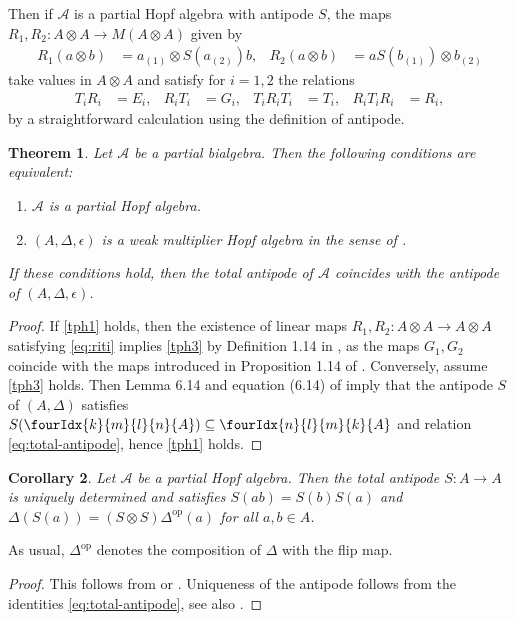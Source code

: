 \documentclass[10pt]{article}
\DeclareMathOperator{\op}{\mathrm{op}}
\newcommand{\Gr}[5]{\fourIdx{#2}{#4}{#3}{#5}{#1}}%
\newtheorem{Theorem}{Theorem}[section]
\newtheorem{Cor}[Theorem]{Corollary}
\theoremstyle{definition}
\numberwithin{equation}{section}
\begin{document}
Then if $\mathscr{A}$ is a partial Hopf algebra with antipode $S$, the maps
  $R_{1},R_{2} \colon A \otimes A \to M(A \otimes A)$ given by
  \begin{align*}
    R_{1}(a \otimes b) &= a_{(1)}\otimes S(a_{(2)})b, &
    R_{2}(a\otimes b) &= aS(b_{(1)})\otimes b_{(2)}
  \end{align*}
  take values in $A\otimes A$ and satisfy for $i=1,2$ the relations
  \begin{align} \label{eq:riti}
    T_{i}R_{i}&=E_{i}, & R_{i}T_{i}&= G_{i}, & T_{i}R_{i}T_{i}&= T_{i}, & R_{i}T_{i}R_{i} &= R_{i},
  \end{align}
by a straightforward calculation using the definition of antipode.


\begin{Theorem}  \label{theorem:partial-hopf-algebra}
  Let $\mathscr{A}$ be a partial bialgebra. Then the
  following conditions are equivalent:
  \begin{enumerate}[label={(\arabic*)}]
  \item\label{tph1} $\mathscr{A}$ is a partial Hopf algebra.
  \item\label{tph3} $(A,\Delta,\epsilon)$  is a weak multiplier Hopf algebra in the sense of \cite{VDW1}.
  \end{enumerate}
  If these conditions hold, then the total  antipode of $\mathscr{A}$ coincides with the antipode of $(A,\Delta,\epsilon)$.
\end{Theorem}
\begin{proof}
If \ref{tph1} holds, then the existence of linear maps $R_{1},R_{2} \colon A\otimes A\to A\otimes A$ satisfying  \eqref{eq:riti} implies \ref{tph3} by Definition
1.14 in \cite{VDW1}, as the maps $G_{1},G_{2}$ coincide with the maps introduced in Proposition 1.14 of \cite{VDW1}.  Conversely, assume \ref{tph3} holds.
 Then Lemma 6.14 and equation (6.14) of \cite{Boh1} imply that the antipode
$S$ of $(A,\Delta)$ satisfies $S(\Gr{A}{k}{l}{m}{n})\subseteq \Gr{A}{n}{m}{l}{k}$ and relation \eqref{eq:total-antipode}, hence \ref{tph1} holds.
\end{proof}

\begin{Cor} \label{corollary:antipode} Let $\mathscr{A}$ be a partial
  Hopf algebra. Then the total antipode $S:A\rightarrow A$ is uniquely determined and satisfies
  $S(ab) = S(b)S(a)$ and $\Delta(S(a)) = (S\otimes S)\Delta^{\op}(a)$
  for all $a,b\in A$.
\end{Cor} 
As usual, $\Delta^{\op}$ denotes  the composition of $\Delta$ with the flip map.
\begin{proof} This follows from \cite[Proposition 3.5 and Proposition 3.7]{VDW1} or \cite[Theorem
6.12 and Corollary 6.16]{Boh1}. Uniqueness of the antipode follows from the identities \eqref{eq:total-antipode}, see also \cite[Remark 2.8.(ii)]{VDW1}. 
\end{proof} 
\end{document}
